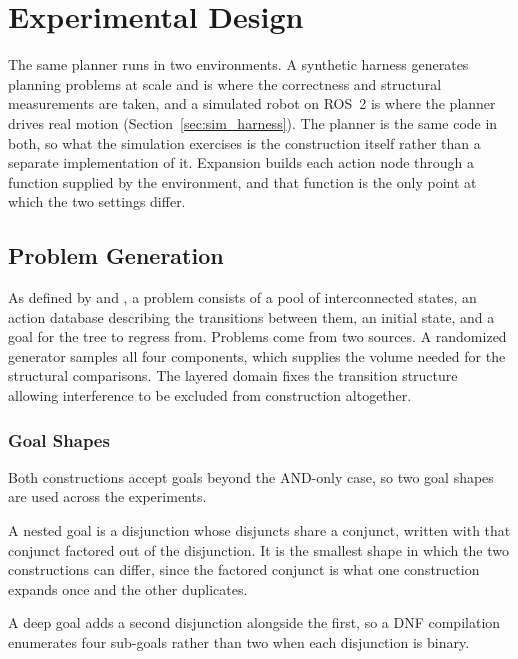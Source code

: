 \chapter{Experimental Design}
\label{ch:experiments}
    The same planner runs in two environments.
    A synthetic harness generates planning problems at scale and is where the correctness and structural measurements are taken, and a simulated robot on ROS~2 is where the planner drives real motion (Section~\ref{sec:sim_harness}).
    The planner is the same code in both, so what the simulation exercises is the construction itself rather than a separate implementation of it.
    Expansion builds each action node through a function supplied by the environment, and that function is the only point at which the two settings differ.

\section{Problem Generation}
\label{sec:problem_generator}
    As defined by \probone and \probprime, a problem consists of a pool of interconnected states, an action database describing the transitions between them, an initial state, and a goal for the tree to regress from.
    Problems come from two sources.
    A randomized generator samples all four components, which supplies the volume needed for the structural comparisons.
    The layered domain fixes the transition structure allowing interference to be excluded from construction altogether.

    \subsection{Goal Shapes}
    \label{subsec:goal_shapes}
    Both constructions accept goals beyond the AND-only case, so two goal shapes are used across the experiments.

    

    A nested goal is a disjunction whose disjuncts share a conjunct, written with that conjunct factored out of the disjunction.
    It is the smallest shape in which the two constructions can differ, since the factored conjunct is what one construction expands once and the other duplicates.

    A deep goal adds a second disjunction alongside the first, so a DNF compilation enumerates four sub-goals rather than two when each disjunction is binary.

